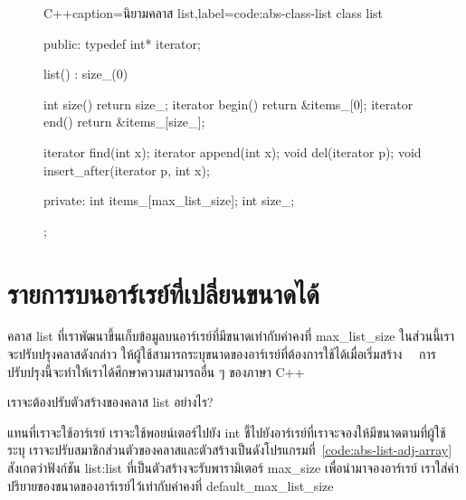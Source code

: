 \begin{figure}
\latintext
\begin{codelist}{C++}{caption={\thaitext นิยาม{\wbr}ค{\wbr}ลา{\wbr}ส {\ct list}\latintext},label=code:abs-class-list}
class list {
public:
  typedef int* iterator;

  list() : size_(0) {}

  int size() { return size_; }
  iterator begin() { return &items_[0]; }
  iterator end() { return &items_[size_]; }

  iterator find(int x);
  iterator append(int x);
  void del(iterator p);
  void insert_after(iterator p, int x);

private:
  int items_[max_list_size];
  int size_;
};
\end{codelist}
\thaitext
\end{figure}

\section{รายการ{\wbr}บน{\wbr}อาร์เรย์{\wbr}ที่{\wbr}เปลี่ยน{\wbr}ขนาด{\wbr}ได้}
ค{\wbr}ลา{\wbr}ส {\ct list} ที่{\wbr}เรา{\wbr}พัฒนา{\wbr}ขึ้น{\wbr}เก็บ{\wbr}ข้อมูล{\wbr}บน{\wbr}อาร์เรย์{\wbr}ที่{\wbr}มี{\wbr}ขนาด{\wbr}เท่า{\wbr}กับ{\wbr}ค่าคงที่ {\ct
  max\_list\_size} ใน{\wbr}ส่วน{\wbr}นี้{\wbr}เรา{\wbr}จะ{\wbr}ปรับปรุง{\wbr}ค{\wbr}ลา{\wbr}ส{\wbr}ดังกล่าว{\wbr}
ให้{\wbr}ผู้ใช้{\wbr}สามารถ{\wbr}ระบุ{\wbr}ขนาด{\wbr}ของ{\wbr}อาร์เรย์{\wbr}ที่{\wbr}ต้องการ{\wbr}ใช้ได้{\wbr}เมื่อ{\wbr}เริ่ม{\wbr}สร้าง{\wbr}
\ \ การ{\wbr}ปรับปรุง{\wbr}นี้{\wbr}จะ{\wbr}ทำ{\wbr}ให้{\wbr}เรา{\wbr}ได้{\wbr}ศึกษา{\wbr}ความ{\wbr}สามารถ{\wbr}อื่น ๆ ของ{\wbr}ภาษา C++

\begin{quiz}{}
เรา{\wbr}จะ{\wbr}ต้อง{\wbr}ปรับ{\wbr}ตัว{\wbr}สร้าง{\wbr}ของ{\wbr}ค{\wbr}ลา{\wbr}ส list อย่างไร?
\end{quiz}

แทน{\wbr}ที่{\wbr}เรา{\wbr}จะ{\wbr}ใช้{\wbr}อาร์เรย์ เรา{\wbr}จะ{\wbr}ใช้{\wbr}พอยน์เตอร์{\wbr}ไป{\wbr}ยัง {\ct int}
ชี้{\wbr}ไป{\wbr}ยัง{\wbr}อาร์เรย์{\wbr}ที่{\wbr}เรา{\wbr}จะ{\wbr}จอง{\wbr}ให้{\wbr}มี{\wbr}ขนาด{\wbr}ตาม{\wbr}ที่{\wbr}ผู้ใช้{\wbr}ระบุ{\wbr}
เรา{\wbr}จะ{\wbr}ปรับ{\wbr}สมาชิก{\wbr}ส่วนตัว{\wbr}ของ{\wbr}ค{\wbr}ลา{\wbr}ส{\wbr}และ{\wbr}ตัว{\wbr}สร้าง{\wbr}เป็น{\wbr}ดัง{\wbr}โปรแกรม{\wbr}ที่~\ref{code:abs-list-adj-array}
สังเกต{\wbr}ว่า{\wbr}ฟังก์ชัน {\ct list:list} ที่{\wbr}เป็น{\wbr}ตัว{\wbr}สร้าง{\wbr}จะ{\wbr}รับ{\wbr}พารามิเตอร์ {\ct max\_size}
เพื่อ{\wbr}นำมา{\wbr}จอง{\wbr}อาร์เรย์ เรา{\wbr}ใส่{\wbr}ค่า{\wbr}ปริยาย{\wbr}ของ{\wbr}ขนาด{\wbr}ของ{\wbr}อาร์เรย์{\wbr}ไว้{\wbr}เท่า{\wbr}กับ{\wbr}ค่าคงที่ {\ct
  default\_max\_list\_size}

